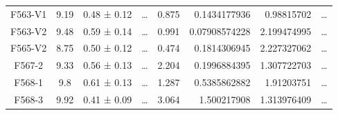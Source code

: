 \documentclass[reprint,%
 amsmath,amssymb,
 aps,
]{revtex4-1}
\begin{document}
\begin{table}[]
\begin{tabular}{cccccrrc}
\rowcolor[HTML]{F3F3F3} 
F563-V1              & 9.19                      & 0.48 ± 0.12           & …                      & 0.875                                                        & 0.1434177936                                                          & 0.98815702                                                            & …                                                             \\
\rowcolor[HTML]{F3F3F3} 
F563-V2              & 9.48                      & 0.59 ± 0.14           & …                      & 0.991                                                        & 0.07908574228                                                         & 2.199474995                                                           & …                                                             \\
\rowcolor[HTML]{F3F3F3} 
F565-V2              & 8.75                      & 0.50 ± 0.12           & …                      & 0.474                                                        & 0.1814306945                                                          & 2.227327062                                                           & …                                                             \\
\rowcolor[HTML]{F3F3F3} 
F567-2               & 9.33                      & 0.56 ± 0.13           & …                      & 2.204                                                        & 0.1996884395                                                          & 1.307722703                                                           & …                                                             \\
\rowcolor[HTML]{F3F3F3} 
F568-1               & 9.8                       & 0.61 ± 0.13           & …                      & 1.287                                                        & 0.5385862882                                                          & 1.91203751                                                            & …                                                             \\
\rowcolor[HTML]{F3F3F3} 
F568-3               & 9.92                      & 0.41 ± 0.09           & …                      & 3.064                                                        & 1.500217908                                                           & 1.313976409                                                           & …                                                             \\

\end{tabular}
\end{table}
\end{document}
